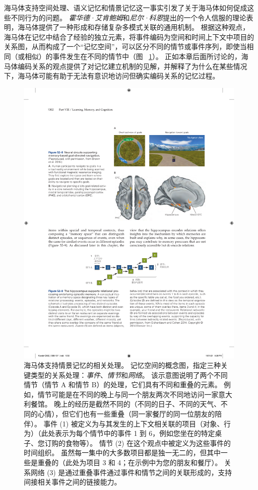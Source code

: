 海马体支持空间处理、语义记忆和情景记忆这一事实引发了关于海马体如何促成这些不同行为的问题。
\textit{霍华德·艾肯鲍姆}和\textit{尼尔·科恩}提出的一个令人信服的理论表明，海马体提供了一种形成和存储复杂多模式关联的通用机制。
根据这种观点，海马体在记忆中结合了经验的独立元素，将事件编码为空间和时间上下文中项目的关系图，从而构成了一个“记忆空间”，可以区分不同的情节或事件序列，即使当相同（或相似）的事件发生在不同的情节中（图 ~\ref{fig:52_9}）。
正如本章后面所讨论的，海马体编码关系的观点提供了对记忆建立机制的见解，并解释了为什么在某些情况下，海马体可能有助于无法有意识地访问但确实编码关系的记忆过程。


\begin{figure}[htbp]
	\centering
	\includegraphics[width=0.75\linewidth]{chap52/fig_52_9}
	\caption{海马体支持情景记忆的相关处理。
		记忆空间的概念图，指定三种关键类型的关系处理：\textit{事件}、\textit{情节}和\textit{网络}。
		该示意图说明了两个不同情节（情节 A 和情节 B）的处理，它们具有不同和重叠的元素。
		例如，情节可能是在不同的晚上与同一个朋友两次不同地访问一家意大利餐馆。
		晚上的经历是截然不同的（不同的日子、不同的天气、不同的心情），但它们也有一些重叠（同一家餐厅的同一位朋友的陪伴）。
		事件 (1) 被定义为与其发生的上下文相关联的项目（对象、行为）（此处表示为每个情节中的事件 1 到 6，例如您坐在的特定桌子、您订购的食物等）。
		情节 (2) 在这个观点中被定义为这些事件的时间组织。 虽然每一集中的大多数项目都是独一无二的，但其中一些是重叠的（此处为项目 3 和 4；在示例中为您的朋友和餐厅）。
		关系网络 (3) 是通过重叠事件通过事件和情节之间的关联形成的，支持间接相关事件之间的链接能力\cite{eichenbaum2014can}。 }
	\label{fig:52_9}
\end{figure}



